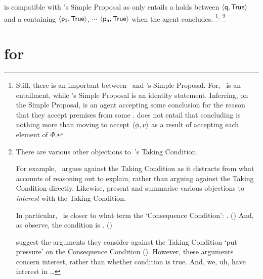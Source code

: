 \begin{note}
  \supportI{} is compatible with \citeauthor{Wright:2014tt}'s Simple Proposal as \supportI{} only entails a \ros{} holds between \(\pv{\propM{q}}{\valI{True}}\) and a \pool{} containing \(\pv{\propM{p_{1}}}{\valI{True}}\), \(\cdots\) \(\pv{\propM{p_{n}}}{\valI{True}}\) when the agent concludes.%
  \footnote{
    Still, there is an important between~\supportI{} and \citeauthor{Wright:2014tt}'s Simple Proposal.
    For,~\supportI{} is an entailment, while \citeauthor{Wright:2014tt}'s Simple Proposal is an identity statement.
    Inferring, on the Simple Proposal, is an agent accepting some conclusion for the reason that they accept premises from some \pool{}.
    \supportI{} does not entail that concluding is nothing more than moving to accept \(\langle \phi, v \rangle\) as a result of accepting each element of \(\Phi\).
  }\(^{,}\)%
  \footnote{
    There are various other objections to~\citeauthor{Boghossian:2014aa}'s Taking Condition.

    For example,~\citeauthor{Hlobil:2014tq} argues against the Taking Condition as it distracts from what accounts of reasoning out to explain, rather than arguing against the Taking Condition directly.
    Likewise, \citeauthor{McHugh:2016vp} present and summarise various objections to \emph{interest} with the Taking Condition.

    In particular,~\supportI{} is closer to what \citeauthor{McHugh:2016vp} term the `Consequence Condition': .
    (\citeyear[316]{McHugh:2016vp})
    And, as \citeauthor{McHugh:2016vp} observe, the condition is .
    (\citeyear[316]{McHugh:2016vp})

    \citeauthor{McHugh:2016vp} suggest the arguments they consider against the Taking Condition `put pressure' on the Consequence Condition (\citeyear[327]{McHugh:2016vp}).
    However, these arguments concern interest, rather than whether condition is true.
    And, we, uh, have interest in \dots
  }
\end{note}




\section{ for }
\label{cha:ros:W}


